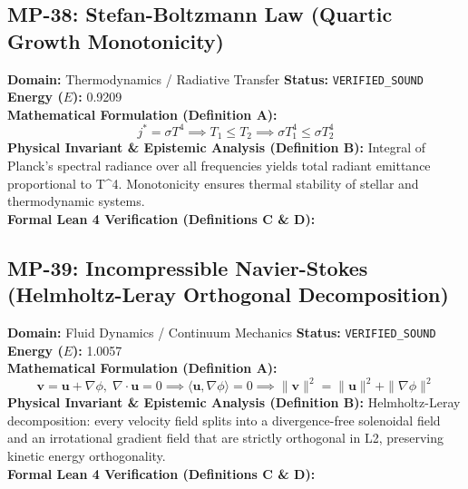 \subsection{MP-38: Stefan-Boltzmann Law (Quartic Growth Monotonicity)}
\textbf{Domain:} Thermodynamics / Radiative Transfer \hfill \textbf{Status:} \texttt{VERIFIED\_SOUND} \hfill \textbf{Energy ($E$):} 0.9209\\
\textbf{Mathematical Formulation (Definition A):}
\begin{equation*}
j^* = \sigma T^4 \implies T_1 \le T_2 \implies \sigma T_1^4 \le \sigma T_2^4
\end{equation*}
\textbf{Physical Invariant \& Epistemic Analysis (Definition B):}
Integral of Planck's spectral radiance over all frequencies yields total radiant emittance proportional to T\textasciicircum{}4. Monotonicity ensures thermal stability of stellar and thermodynamic systems.\\

\textbf{Formal Lean 4 Verification (Definitions C \& D):}


\vspace{1em}
\subsection{MP-39: Incompressible Navier-Stokes (Helmholtz-Leray Orthogonal Decomposition)}
\textbf{Domain:} Fluid Dynamics / Continuum Mechanics \hfill \textbf{Status:} \texttt{VERIFIED\_SOUND} \hfill \textbf{Energy ($E$):} 1.0057\\
\textbf{Mathematical Formulation (Definition A):}
\begin{equation*}
\mathbf{v} = \mathbf{u} + \nabla \phi, \; \nabla \cdot \mathbf{u} = 0 \implies \langle \mathbf{u}, \nabla \phi \rangle = 0 \implies \|\mathbf{v}\|^2 = \|\mathbf{u}\|^2 + \|\nabla \phi\|^2
\end{equation*}
\textbf{Physical Invariant \& Epistemic Analysis (Definition B):}
Helmholtz-Leray decomposition: every velocity field splits into a divergence-free solenoidal field and an irrotational gradient field that are strictly orthogonal in L2, preserving kinetic energy orthogonality.\\

\textbf{Formal Lean 4 Verification (Definitions C \& D):}


